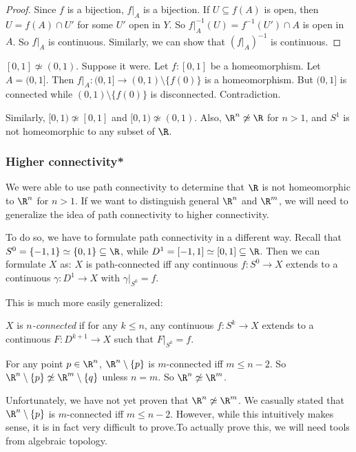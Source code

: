 \documentclass[a4paper]{article}
\begin{document}
\begin{proof}
  Since $f$ is a bijection, $f|_A$ is a bijection. If $U\subseteq f(A)$ is open, then $U = f(A) \cap U'$ for some $U'$ open in $Y$. So $f|_A^{-1}(U) = f^{-1}(U')\cap A$ is open in $A$. So $f|_A$ is continuous. Similarly, we can show that $(f|_A)^{-1}$ is continuous.
\end{proof}

\begin{eg} $[0, 1] \not\simeq (0, 1)$. Suppose it were. Let $f: [0, 1]$ be a homeomorphism. Let $A = (0, 1]$. Then $f|_A: (0, 1] \to (0, 1)\setminus\{f(0)\}$ is a homeomorphism. But $(0, 1]$ is connected while $(0, 1)\setminus \{f(0)\}$ is disconnected. Contradiction.

Similarly, $[0, 1)\not\simeq [0, 1]$ and $[0, 1)\not\simeq (0, 1)$. Also, $\R^n\not \simeq \R$ for $n > 1$, and $S^1$ is not homeomorphic to any subset of $\R$.
\end{eg}

\subsubsection{Higher connectivity*}
We were able to use path connectivity to determine that $\R$ is not homeomorphic to $\R^n$ for $n > 1$. If we want to distinguish general $\R^n$ and $\R^m$, we will need to generalize the idea of path connectivity to higher connectivity.

To do so, we have to formulate path connectivity in a different way. Recall that $S^0 = \{-1, 1\} \simeq \{0, 1\}\subseteq \R$, while $D^1 = [-1, 1] \simeq [0, 1] \subseteq \R$. Then we can formulate $X$ as: $X$ is path-connected iff any continuous $f: S^0\to X$ extends to a continuous $\gamma: D^1 \to X$ with $\gamma|_{S^0} = f$.

This is much more easily generalized:
\begin{defi}[$n$-connectedness]
  $X$ is $n$\emph{-connected} if for any $k \leq n$, any continuous $f: S^k \to X$ extends to a continuous $F: D^{k + 1}\to X$ such that $F|_{S^k} = f$.
\end{defi}
For any point $p\in \R^n$, $\R^n \setminus \{p\}$ is $m$-connected iff $m \leq n - 2$. So $\R^n\setminus\{p\} \not\simeq \R^m\setminus\{q\}$ unless $n = m$. So $\R^n \not\simeq \R^m$.

Unfortunately, we have not yet proven that $\R^n \not\simeq \R^m$. We casually stated that $\R^n \setminus \{p\}$ is $m$-connected iff $m \leq n - 2$. However, while this intuitively makes sense, it is in fact very difficult to prove.To actually prove this, we will need tools from algebraic topology.
\end{document}
